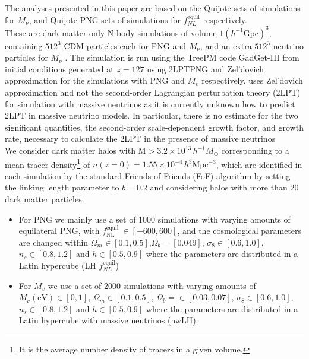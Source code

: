 The analyses presented in this paper are based on the Quijote \cite{Villaescusa_Navarro_2020}  sets of simulations for $M_{\nu}$, and Quijote-PNG \cite{Coulton_2023}  sets of simulations for $f_{NL}^{\mathrm{equil}}$  respectively.\\
These are dark matter only $\mathrm{N}$-body simulations of volume $1\left(h^{-1} \mathrm{Gpc}\right)^3$, containing $512^{3}$ CDM particles each for PNG and $M_{\nu}$, and an extra $512^{3}$ neutrino particles for $M_{\nu}$ . The simulation is run using the TreePM code GadGet-III \cite{Springel2005Natur.435..629S} from initial conditions generated at $z=127$ using 2LPTPNG \cite{Coulton_2023} and Zel'dovich approximation \cite{Zel1970A&A.....5...84Z}  for the simulations with PNG and $M_{v}$ respectively. \cite{Villaescusa_Navarro_2020} uses Zel’dovich approximation and not the second-order Lagrangian perturbation theory (2LPT) for simulation with massive neutrinos as it is currently unknown how to predict 2LPT in massive neutrino models. In particular, there is no estimate for the two significant quantities, the second-order scale-dependent growth factor, and growth rate, necessary to calculate the 2LPT in the presence of massive neutrinos
\\ 
We consider dark matter halos with $ \text{M} > 3.2 \times 10^{13}\, h^{-1} M_{\odot}$ corresponding to a mean tracer density\footnote{It is the average number density of tracers in a given volume.} of $\bar{n}(z = 0) = 1.55 \times 10^{-4}\, h^{3} \mathrm{Mpc}^{-3}$, which are identified in each simulation by the standard Friends-of-Friends (FoF) algorithm \cite{FOFDavis1985ApJ...292..371D} by setting the linking length parameter to $b=0.2$ and considering halos with more than 20 dark matter particles.\\

\begin{itemize}
    \item For PNG we mainly use a set of 1000 simulations with varying amounts of equilateral PNG, with $f_{\mathrm{NL}}^{\text {equil }} \in[-600,600]$, and the cosmological parameters are changed within $\Omega_{m} \in[0.1,0.5]$,$\Omega_{b} = [0.049]$, $\sigma_{8} \in[0.6,1.0]$,$n_{s} \in[0.8,1.2]$ and $h \in[0.5,0.9]$ where the parameters are distributed in a Latin hypercube (LH $f_{NL}^{\mathrm{equil}}$) 
    
    \item For $M_{v}$ we use a set of 2000 simulations with varying amounts of $M_{\nu}(\mathrm{eV})  \in[0,1]$, $\Omega_{m} \in[0.1,0.5]$, $\Omega_{b} = \in[0.03, 0.07]$, $\sigma_{8} \in[0.6,1.0]$, $n_{s} \in[0.8,1.2]$ and $h \in[0.5,0.9]$ where the parameters are distributed in a Latin hypercube with massive neutrinos (nwLH).
\end{itemize}



